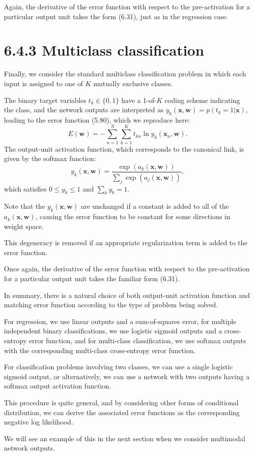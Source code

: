 \documentclass{article}
\begin{document}
Again, the derivative of the error function with respect to the pre-activation for a particular output unit takes the form (6.31), just as in the regression case.

\section{6.4.3 Multiclass classification}

Finally, we consider the standard multiclass classification problem in which each input is assigned to one of $K$ mutually exclusive classes. 

The binary target variables $t_k \in \{0,1\}$ have a 1-of-$K$ coding scheme indicating the class, and the network outputs are interpreted as $y_k(\mathbf{x}, \mathbf{w}) = p(t_k = 1|\mathbf{x})$, leading to the error function (5.80), which we reproduce here:
\begin{equation}
E(\mathbf{w}) = -\sum_{n=1}^N \sum_{k=1}^K t_{kn} \ln y_k(\mathbf{x}_n, \mathbf{w}).
\tag{6.36}
\end{equation}
The output-unit activation function, which corresponds to the canonical link, is given by the softmax function:
\begin{equation}
y_k(\mathbf{x}, \mathbf{w}) = \frac{\exp(a_k(\mathbf{x}, \mathbf{w}))}{\sum_j \exp(a_j(\mathbf{x}, \mathbf{w}))},
\tag{6.37}
\end{equation}
which satisfies $0 \leqslant y_k \leqslant 1$ and $\sum_k y_k = 1$. 

Note that the $y_k(\mathbf{x}, \mathbf{w})$ are unchanged if a constant is added to all of the $a_k(\mathbf{x}, \mathbf{w})$, causing the error function to be constant for some directions in weight space. 

This degeneracy is removed if an appropriate regularization term is added to the error function. 

Once again, the derivative of the error function with respect to the pre-activation for a particular output unit takes the familiar form (6.31).

In summary, there is a natural choice of both output-unit activation function and matching error function according to the type of problem being solved. 

For regression, we use linear outputs and a sum-of-squares error, for multiple independent binary classifications, we use logistic sigmoid outputs and a cross-entropy error function, and for multi-class classification, we use softmax outputs with the corresponding multi-class cross-entropy error function. 

For classification problems involving two classes, we can use a single logistic sigmoid output, or alternatively, we can use a network with two outputs having a softmax output activation function.

This procedure is quite general, and by considering other forms of conditional distribution, we can derive the associated error functions as the corresponding negative log likelihood. 

We will see an example of this in the next section when we consider multimodal network outputs.
\end{document}
